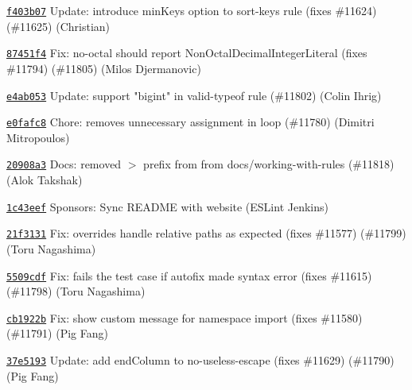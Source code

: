 \begin{DoxyItemize}
\item \href{https://github.com/eslint/eslint/commit/f403b07283f91f1285d8318d6acea851dd765755}{\texttt{ {\ttfamily f403b07}}} Update\+: introduce min\+Keys option to sort-\/keys rule (fixes \#11624) (\#11625) (Christian)
\item \href{https://github.com/eslint/eslint/commit/87451f4779bc4c0ec874042b6854920f947ee258}{\texttt{ {\ttfamily 87451f4}}} Fix\+: no-\/octal should report Non\+Octal\+Decimal\+Integer\+Literal (fixes \#11794) (\#11805) (Milos Djermanovic)
\item \href{https://github.com/eslint/eslint/commit/e4ab0531c4e44c23494c6a802aa2329d15ac90e5}{\texttt{ {\ttfamily e4ab053}}} Update\+: support "{}bigint"{} in valid-\/typeof rule (\#11802) (Colin Ihrig)
\item \href{https://github.com/eslint/eslint/commit/e0fafc8ef59a80a6137f4170bbe46582d6fbcafc}{\texttt{ {\ttfamily e0fafc8}}} Chore\+: removes unnecessary assignment in loop (\#11780) (Dimitri Mitropoulos)
\item \href{https://github.com/eslint/eslint/commit/20908a38f489c285abf8fceef4d9d13bf8b87f22}{\texttt{ {\ttfamily 20908a3}}} Docs\+: removed \textquotesingle{}\texorpdfstring{$>$}{>}\textquotesingle{} prefix from from docs/working-\/with-\/rules (\#11818) (Alok Takshak)
\item \href{https://github.com/eslint/eslint/commit/1c43eef605a9cf02a157881424ea62dcae747f69}{\texttt{ {\ttfamily 1c43eef}}} Sponsors\+: Sync README with website (ESLint Jenkins)
\item \href{https://github.com/eslint/eslint/commit/21f3131aa1636afa8e5c01053e0e870f968425b1}{\texttt{ {\ttfamily 21f3131}}} Fix\+: {\ttfamily overrides} handle relative paths as expected (fixes \#11577) (\#11799) (Toru Nagashima)
\item \href{https://github.com/eslint/eslint/commit/5509cdfa1b3d575248eef89a935f79c82e3f3071}{\texttt{ {\ttfamily 5509cdf}}} Fix\+: fails the test case if autofix made syntax error (fixes \#11615) (\#11798) (Toru Nagashima)
\item \href{https://github.com/eslint/eslint/commit/cb1922bdc07e58de0e55c13fd992dd8faf3292a4}{\texttt{ {\ttfamily cb1922b}}} Fix\+: show custom message for namespace import (fixes \#11580) (\#11791) (Pig Fang)
\item \href{https://github.com/eslint/eslint/commit/37e5193102d7544f155cdcb09c7c50dc602914d4}{\texttt{ {\ttfamily 37e5193}}} Update\+: add {\ttfamily end\+Column} to no-\/useless-\/escape (fixes \#11629) (\#11790) (Pig Fang)

\end{DoxyItemize}
